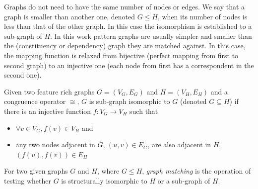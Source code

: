 Graphs do not need to have the same number of nodes or edges. We say that a graph is smaller than another one, denoted $G \leq H$, when its number of nodes is less than that of the other graph. In this case the isomorphism is established to a sub-graph of $H$. 
In this work pattern graphs are usually simpler and smaller than the (constituency or dependency) graph they are matched against. 
In this case, the mapping function is relaxed from bijective (perfect mapping from first to second graph) to an injective one (each node from first has a correspondent in the second one).



\begin{definition}\label{def:sgisomorphism}
       Given two feature rich graphs $G=(V_G,E_G)$ and $H=(V_H,E_H)$ and a congruence operator $\cong$, $G$ is sub-graph isomorphic to $G$ (denoted $G \subseteq H$) if there is an injective function $f:V_G \rightarrow V_H$ such that
   \begin{itemize}
       \item $\forall v \in V_G, f(v) \in V_H$ and
       \item any two nodes adjacent in $G$, $(u,v) \in E_G$, are also adjacent in $H$, $(f(u), f(v)) \in E_H $
   \end{itemize}
\end{definition}

\begin{definition}\label{def:gmatching}
    For two given graphs $G$ and $H$, where $G \leq H$, \textit{graph matching} is the operation of testing whether $G$ is structurally isomorphic to $H$ or a sub-graph of $H$.
\end{definition}

